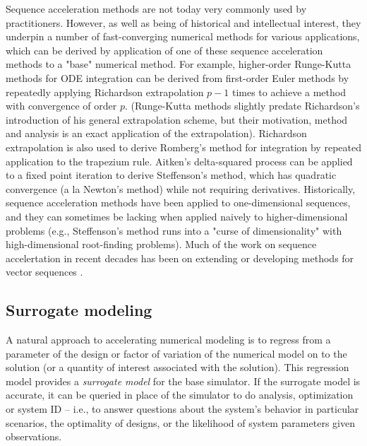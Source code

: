 \documentclass{puthesis}
\begin{document}
Sequence acceleration methods are not today very commonly used by practitioners.
However, as well as being of historical and intellectual interest,
they underpin a number of fast-converging
numerical methods for various applications,
which can be derived by application of one of these
sequence acceleration methods to a "base" numerical method.
For example, higher-order Runge-Kutta methods for ODE integration can be derived from
first-order Euler methods by repeatedly applying Richardson extrapolation
$p-1$ times to achieve a method with convergence of order $p$.
(Runge-Kutta methods slightly predate Richardson's introduction of his general
extrapolation scheme, but their motivation, method and analysis is an exact application
of the extrapolation).
Richardson extrapolation is also used to derive Romberg's method for integration by repeated application to the trapezium rule.
Aitken's delta-squared process can be applied to a fixed point
iteration to derive Steffenson's method, which has quadratic convergence (a la Newton's method) while not requiring derivatives.
Historically, sequence acceleration methods have been applied to one-dimensional sequences,
and they can sometimes be lacking when applied naively to higher-dimensional problems (e.g., Steffenson's method runs into a "curse of dimensionality" with high-dimensional root-finding problems).
Much of the work on sequence accelertation in recent decades has
been on extending or developing methods for vector sequences \citep{osada1991acceleration}.


\subsection{Surrogate modeling}
A natural approach to accelerating numerical modeling is to regress from a parameter
of the design or factor of variation of the numerical model
on to the solution (or a quantity of interest associated with the solution).
This regression model provides a \emph{surrogate model} for the base simulator.
If the surrogate model is accurate, it can be queried in place of the simulator to
do analysis, optimization or system ID -- i.e., to answer questions about the
system's behavior in particular scenarios, the optimality of designs, or the
likelihood of system parameters given observations.
\end{document}
